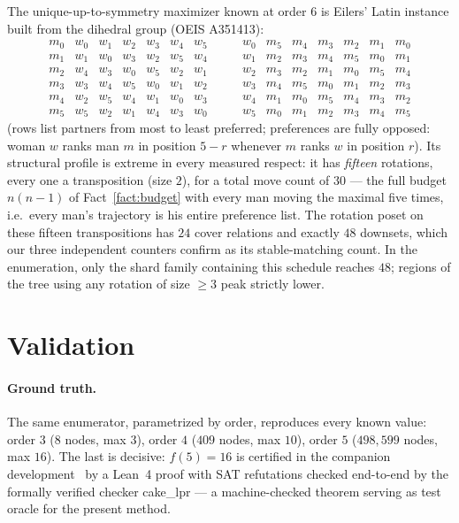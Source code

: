 \documentclass[11pt]{article}
\begin{document}
The unique-up-to-symmetry maximizer known at order $6$ is Eilers' Latin instance built
from the dihedral group (OEIS A351413):
\[
\begin{array}{c|cccccc}
m_0 & w_0 & w_1 & w_2 & w_3 & w_4 & w_5\\
m_1 & w_1 & w_0 & w_3 & w_2 & w_5 & w_4\\
m_2 & w_4 & w_3 & w_0 & w_5 & w_2 & w_1\\
m_3 & w_3 & w_4 & w_5 & w_0 & w_1 & w_2\\
m_4 & w_2 & w_5 & w_4 & w_1 & w_0 & w_3\\
m_5 & w_5 & w_2 & w_1 & w_4 & w_3 & w_0
\end{array}
\qquad
\begin{array}{c|cccccc}
w_0 & m_5 & m_4 & m_3 & m_2 & m_1 & m_0\\
w_1 & m_2 & m_3 & m_4 & m_5 & m_0 & m_1\\
w_2 & m_3 & m_2 & m_1 & m_0 & m_5 & m_4\\
w_3 & m_4 & m_5 & m_0 & m_1 & m_2 & m_3\\
w_4 & m_1 & m_0 & m_5 & m_4 & m_3 & m_2\\
w_5 & m_0 & m_1 & m_2 & m_3 & m_4 & m_5
\end{array}
\]
(rows list partners from most to least preferred; preferences are fully opposed:
woman $w$ ranks man $m$ in position $5-r$ whenever $m$ ranks $w$ in position $r$). Its structural profile is extreme in every measured respect: it has
\emph{fifteen} rotations, every one a transposition (size $2$), for a total move count
of $30$ --- the full budget $n(n-1)$ of Fact~\ref{fact:budget} with every man moving the
maximal five times, i.e.\ every man's trajectory is his entire preference list. The
rotation poset on these fifteen transpositions has $24$ cover relations and exactly $48$
downsets, which our three independent counters confirm as its stable-matching count.
In the enumeration, only the shard family containing this schedule reaches $48$;
regions of the tree using any rotation of size $\ge 3$ peak strictly lower.

\section{Validation}\label{sec:valid}

\paragraph{Ground truth.} The same enumerator, parametrized by order, reproduces every known
value: order $3$ ($8$ nodes, max $3$), order $4$ ($409$ nodes, max $10$), order $5$
($498{,}599$ nodes, max $16$). The last is decisive: $f(5)=16$ is certified in the companion
development~\cite{f5paper} by a Lean~4 proof with SAT refutations checked end-to-end by the
formally verified checker cake\_lpr --- a machine-checked theorem serving as test oracle for the
present method.
\end{document}
